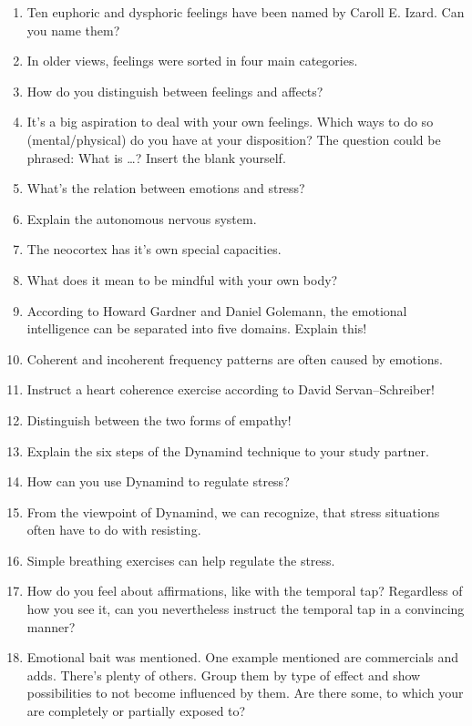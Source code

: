 \documentclass[../main.tex]{subfiles}
\begin{document}
\begin{enumerate}
  \vspace{4mm}
\item Ten euphoric and dysphoric feelings have been named by Caroll E. Izard. Can you name them? %
\item In older views, feelings were sorted in four main categories. %
\item  How do you distinguish between feelings and affects? %
\item It's a big aspiration to deal with your own feelings.
  Which ways to do so (mental/physical) do you have at your disposition?
  The question could be phrased: What is \ldots? Insert the blank yourself.
  \vspace{4mm}
\item What's the relation between emotions and stress?
\item Explain the autonomous nervous system.
  \vspace{4mm}
\item The neocortex has it's own special capacities.
  \vspace{4mm}
\item What does it mean to be mindful with your own body?
  \vspace{4mm}
\item According to Howard Gardner and Daniel Golemann, the emotional intelligence can be separated into five domains.
  Explain this!
    \vspace{4mm}
\item Coherent and incoherent frequency patterns are often caused by emotions.
  \vspace{4mm}
\item Instruct a heart coherence exercise according to David Servan--Schreiber!
  \vspace{4mm}
\item Distinguish between the two forms of empathy!
  \vspace{4mm}
\item Explain the six steps of the Dynamind technique to your study partner.
\item How can you use Dynamind to regulate stress?
  \vspace{4mm}
\item From the viewpoint of Dynamind, we can recognize, that stress situations often have to do with resisting.
  \vspace{4mm}
\item Simple breathing exercises can help regulate the stress.
  \vspace{4mm}
\item How do you feel about affirmations, like with the temporal tap?
  Regardless of how you see it, can you nevertheless instruct the temporal tap in a convincing manner?
\item Emotional bait was mentioned. One example mentioned are commercials and adds.
  There's plenty of others.
  Group them by type of effect and show possibilities to not become influenced by them.
  Are there some, to which your are completely or partially exposed to?
\end{enumerate}
\end{document}
